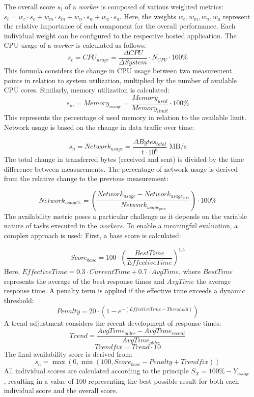 \documentclass[twocolumn]{webofc}
\begin{document}
The overall score \( s_i \) of a \textit{worker} is composed of various weighted metrics: $s_i = w_c \cdot s_c + w_m \cdot s_m + w_n \cdot s_n + w_a \cdot s_a$. Here, the weights \( w_c, w_m, w_n, w_a \) represent the relative importance of each component for the overall performance. Each individual weight can be configured to the respective hosted application. The CPU usage of a \textit{worker} is calculated as follows:
$$s_c = CPU_{usage} = \frac{\Delta CPU}{\Delta System} \cdot N_{CPU} \cdot 100\%$$
This formula considers the change in CPU usage between two measurement points in relation to system utilization, multiplied by the number of available CPU cores. Similarly, memory utilization is calculated:
$$s_m =Memory_{usage} = \frac{Memory_{used}}{Memory_{limit}} \cdot 100\%$$
This represents the percentage of used memory in relation to the available limit. Network usage is based on the change in data traffic over time:

$$s_n = Network_{usage} = \frac{\Delta Bytes_{total}}{t \cdot 10^6} \text{ MB/s}$$
The total change in transferred bytes (received and sent) is divided by the time difference between measurements. The percentage of network usage is derived from the relative change to the previous measurement:

$$Network_{usage\%} = \left(\frac{Network_{usage} - Network_{usage_{prev}}}{Network_{usage_{prev}}}\right) \cdot 100\%$$
The availability metric poses a particular challenge as it depends on the variable nature of tasks executed in the \textit{workers}. To enable a meaningful evaluation, a complex approach is used: First, a base score is calculated:

$$Score_{base} = 100 \cdot \left(\frac{BestTime}{EffectiveTime}\right)^{1.5}$$
Here, \( EffectiveTime = 0.3 \cdot CurrentTime + 0.7 \cdot AvgTime \), where \( BestTime \) represents the average of the best response times and \( AvgTime \) the average response time. A penalty term is applied if the effective time exceeds a dynamic threshold:
$$Penalty = 20 \cdot (1 - e^{-(EffectiveTime - Threshold)})$$ A trend adjustment considers the recent development of response times:
$$Trend = \frac{AvgTime_{older} - AvgTime_{recent}}{AvgTime_{older}}$$
$$Trendfix = Trend \cdot 10$$
The final availability score is derived from:
$$s_a = \max(0, \min(100, Score_{base} - Penalty + Trendfix))$$
All individual scores are calculated according to the principle \( S_X = 100\% - Y_{usage} \), resulting in a value of 100 representing the best possible result for both each individual score and the overall score.
\end{document}
